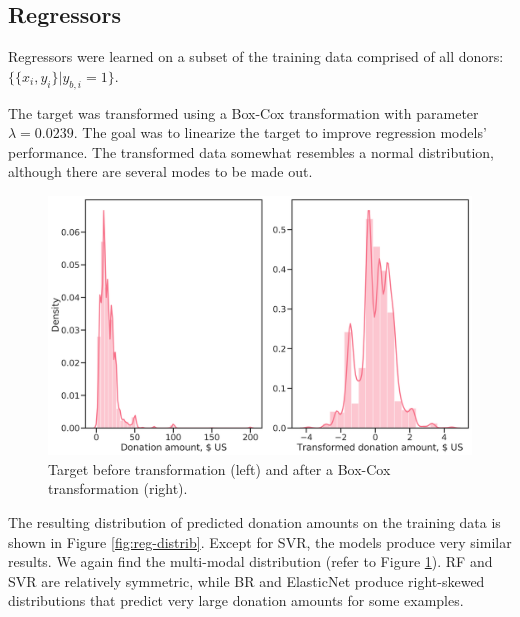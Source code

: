 \documentclass[
  11pt,
  a4paper,
  DIV=12,captions=tableheading,oneside,titlepage]{scrbook}
\begin{document}
\hypertarget{regressors-1}{%
\subsection{Regressors}\label{regressors-1}}

Regressors were learned on a subset of the training data comprised of all donors: \(\{\{x_i, y_i\}|y_{b,i} = 1\}\).

The target was transformed using a Box-Cox transformation with parameter \(\lambda=0.0239\). The goal was to linearize the target to improve regression models' performance. The transformed data somewhat resembles a normal distribution, although there are several modes to be made out.

\begin{figure}

{\centering \includegraphics[width=0.7\linewidth]{figures/learning/target_d-distributions-before-after-transformation} 

}

\caption{Target before transformation (left) and after a Box-Cox transformation (right).}\label{fig:reg-targ-transform}
\end{figure}

The resulting distribution of predicted donation amounts on the training data is shown in Figure \ref{fig:reg-distrib}. Except for SVR, the models produce very similar results. We again find the multi-modal distribution (refer to Figure \ref{fig:reg-targ-transform}). RF and SVR are relatively symmetric, while BR and ElasticNet produce right-skewed distributions that predict very large donation amounts for some examples.
\end{document}
